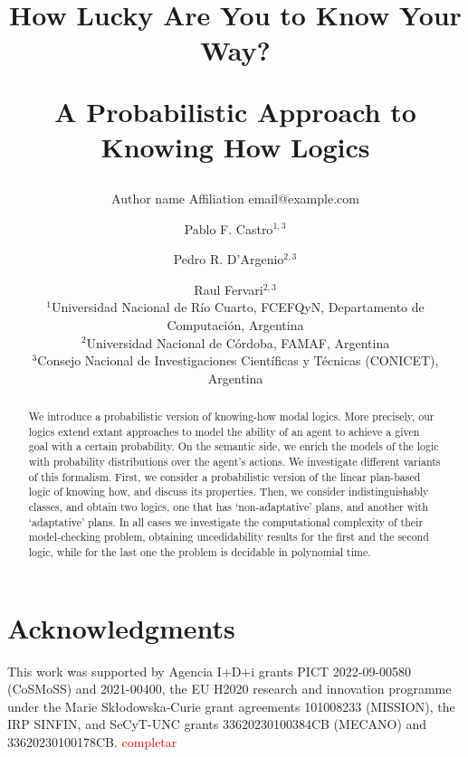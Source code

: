 \documentclass{article}
\title{How Lucky Are You to Know Your Way?\par A Probabilistic Approach to Knowing How Logics}   %
\author{%
    Author name
    \affiliations
    Affiliation
    \emails
    email@example.com    %
}
\author{%
Pablo F. Castro$^{1,3}$\and
Pedro R. D'Argenio$^{2,3}$\and
Raul Fervari$^{2,3}$ \\
\affiliations
$^1$Universidad Nacional de R\'io Cuarto, FCEFQyN, Departamento de Computaci\'on, Argentina\\
$^2$Universidad Nacional de C\'ordoba, FAMAF, Argentina\\
$^3$Consejo Nacional de Investigaciones Cient\'ificas y T\'ecnicas (CONICET), Argentina\\
}
\begin{document}
\maketitle

\begin{abstract}
  We introduce a probabilistic version of knowing-how modal logics.  More precisely,  our logics extend extant approaches to model the ability of an agent to achieve a given goal with a certain probability.  On the semantic side,  we enrich the models of the logic with probability distributions over the agent's actions.  We investigate different variants of this formalism.  First,  we consider a probabilistic version of the linear plan-based logic of knowing how, and discuss its properties. Then, we consider indistinguishably classes,  and obtain two logics,  one that has `non-adaptative' plans, and another  with `adaptative' plans. In all cases we investigate the computational complexity of their model-checking problem, obtaining uncedidability results for the first and the second logic, while for the last one the problem is decidable in polynomial time.  
\end{abstract}







\section*{Acknowledgments}

This work was supported by Agencia I$+$D$+$i grants PICT 2022-09-00580
({\scriptsize CoSMoSS}) and 
2021-00400,
%
the EU H2020 research and innovation programme
under the Marie Sk{\l}odowska-Curie grant agreements 101008233
({\scriptsize MISSION}),
%
the IRP SINFIN, 
%
and SeCyT-UNC grants 33620230100384CB ({\scriptsize MECANO}) and 33620230100178CB.
%
\textcolor{red}{completar}










\newpage
\appendix


\end{document}
